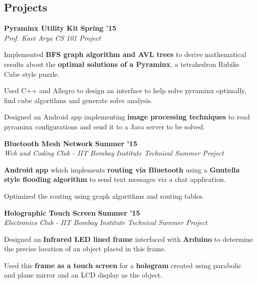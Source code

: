 \documentclass[11pt]{resume}
\begin{document}
\begin{resume}
\vspace{-2.5mm}



\pagebreak
\vspace{-1em}
\section{\mysidestyle Projects}
\textbf{Pyraminx Utility Kit} \hfill \textbf{Spring '15}\\
\textsl{Prof. Kavi Arya} \hfill \textsl{CS 101 Project}\\
\vspace{-4mm}
\begin{list2}
\item Implemented \textbf{BFS graph algorithm and AVL trees} to derive mathematical results about the \textbf{optimal solutions of a Pyraminx}, a tetrahedron Rubiks Cube style puzzle.
\item Used C++ and Allegro to design an interface to help solve pyraminx optimally, find cube algorithms and generate solve analysis.
\item Designed an Android app implementing \textbf{image processing techniques} to read pyraminx configurations and send it to a Java server to be solved.
\end{list2}

\textbf{Bluetooth Mesh Network} \hfill \textbf{Summer '15}\\
\textsl{Web and Coding Club - IIT Bombay} \hfill \textsl{Institute Technical Summer Project}\\
\vspace{-4mm}
\begin{list2}
\item  \textbf{Android app} which implements \textbf{routing via Bluetooth} using a \textbf{Gnutella style flooding algorithm} to send text messages via a chat application.
\item Optimized the routing using graph algorithms and routing tables.
\end{list2}


\textbf{Holographic Touch Screen} \hfill \textbf{Summer '15}\\
\textsl{Electronics Club - IIT Bombay} \hfill \textsl{Institute Technical Summer Project}\\
\vspace{-4mm}
\begin{list2}
\item Designed an \textbf{Infrared LED lined frame} interfaced with \textbf{Arduino} to determine the precise location of an object placed in this frame.
\item Used this \textbf{frame as a touch screen} for a \textbf{hologram} created using parabolic and plane mirror and an LCD display as the object.
\end{list2}


\end{resume}
\end{document}

